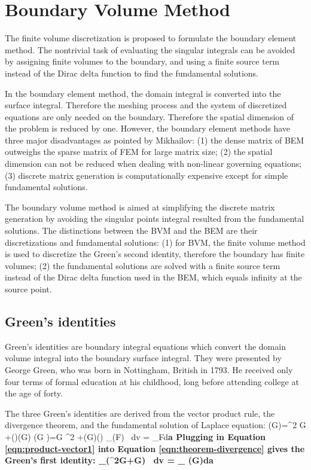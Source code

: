 \section{Boundary Volume Method}

The finite volume discretization is proposed to formulate the boundary element method. The nontrivial task of evaluating the singular integrals can be avoided by assigning finite volumes to the boundary, and using a finite source term instead of the Dirac delta function to find the fundamental solutions.

In the boundary element method, the domain integral is converted into the surface integral. Therefore the meshing process and the system of discretized equations are only needed on the boundary. Therefore the spatial dimension of the problem is reduced by one. However, the boundary element methods have three major disadvantages as pointed by Mikhailov\cite{Mikhailov05, Mikhailov02}: (1) the dense matrix of BEM outweighs the sparse matrix of FEM for large matrix size; (2) the spatial dimension can not be reduced when dealing with non-linear governing equations; (3) discrete matrix generation is computationally expensive except for simple fundamental solutions.

The boundary volume method is aimed at simplifying the discrete matrix generation by avoiding the singular points integral resulted from the fundamental solutions. The distinctions between the BVM and the BEM are their discretizations and fundamental solutions: (1) for BVM, the finite volume method is used to discretize the Green's second identity, therefore the boundary has finite volumes; (2) the fundamental solutions are solved with a finite source term instead of the Dirac delta function used in the BEM, which equals infinity at the source point.


\subsection{Green's identities}

Green's identities are boundary integral equations which convert the domain volume integral into the boundary surface integral. They were presented by George Green, who was born in Nottingham, British in 1793. He received only four terms of formal education at his childhood, long before attending college at the age of forty\citep{Cannell01}.

The three Green's identities are derived from the vector product rule, the divergence theorem, and the fundamental solution of Laplace equation\cite{Green1828,Cheng05}:
\be
\n\cd(\Phi\n G)=\Phi \n^2 G +(\n \Phi)\cd(\n G)
\label{eqn:product-vector1}
\ee
\be
\n\cd(G \n \Phi)=G \n^2 \Phi +(\n G)\cd(\n \Phi)
\label{eqn:product-vector2}
\ee
\be
\int_{\Omega}(\n\cd F) \ dv = \int_{\p \Omega}F\cd d\bf{a}
\label{eqn:theorem-divergence}
\ee
Plugging in Equation \ref{eqn:product-vector1} into Equation \ref{eqn:theorem-divergence} gives the Green's first identity:
\be
\int_{\Omega}(\Phi\n^2G+\n \Phi \cd \n G) \ dv = \int_{\p \Omega} (\Phi\n G)\cd d\bf{a}
\ee

